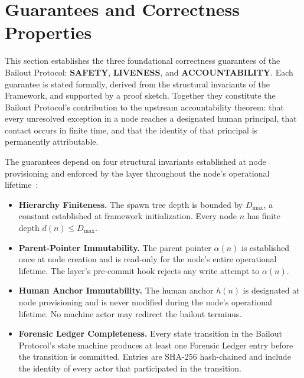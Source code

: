 \section{Guarantees and Correctness Properties}
\label{sec:guarantees}

This section establishes the three foundational correctness guarantees of the
Bailout Protocol: \textbf{SAFETY}, \textbf{LIVENESS}, and \textbf{ACCOUNTABILITY}.
Each guarantee is stated formally, derived from the structural invariants of the
\bxthree{} Framework, and supported by a proof sketch.  Together they constitute
the Bailout Protocol's contribution to the upstream accountability theorem: that
every unresolved exception in a \bxthree{} node reaches a designated human
principal, that contact occurs in finite time, and that the identity of that
principal is permanently attributable.

The guarantees depend on four structural invariants established at node
provisioning and enforced by the \fact{} layer throughout the node's operational
lifetime~\cite{bailoutprotocol2026}:

\begin{itemize}\itemsep=0pt
\item[\textbf{I1}] \textbf{Hierarchy Finiteness.}  The spawn tree depth is bounded
  by $D_{\max}$, a constant established at framework initialization.  Every node
  $n$ has finite depth $d(n) \leq D_{\max}$.

\item[\textbf{I2}] \textbf{Parent-Pointer Immutability.}  The parent pointer
  $\alpha(n)$ is established once at node creation and is read-only for the
  node's entire operational lifetime.  The \fact{} layer's pre-commit hook
  rejects any write attempt to $\alpha(n)$.

\item[\textbf{I3}] \textbf{Human Anchor Immutability.}  The human anchor
  $h(n)$ is designated at node provisioning and is never modified during the
  node's operational lifetime.  No machine actor may redirect the bailout terminus.

\item[\textbf{I4}] \textbf{Forensic Ledger Completeness.}  Every state
  transition in the Bailout Protocol's state machine produces at least one
  Forensic Ledger entry before the transition is committed.  Entries are
  SHA-256 hash-chained and include the identity of every actor that participated
  in the transition.
\end{itemize}

